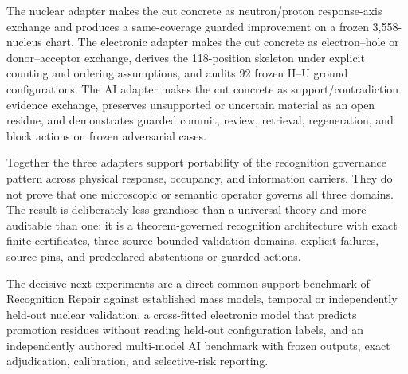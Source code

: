 The nuclear adapter makes the cut concrete as neutron/proton response-axis exchange and produces a same-coverage guarded improvement on a frozen 3,558-nucleus chart. The electronic adapter makes the cut concrete as electron--hole or donor--acceptor exchange, derives the 118-position skeleton under explicit counting and ordering assumptions, and audits 92 frozen H--U ground configurations. The AI adapter makes the cut concrete as support/contradiction evidence exchange, preserves unsupported or uncertain material as an open residue, and demonstrates guarded commit, review, retrieval, regeneration, and block actions on frozen adversarial cases.

Together the three adapters support portability of the recognition governance pattern across physical response, occupancy, and information carriers. They do not prove that one microscopic or semantic operator governs all three domains. The result is deliberately less grandiose than a universal theory and more auditable than one: it is a theorem-governed recognition architecture with exact finite certificates, three source-bounded validation domains, explicit failures, source pins, and predeclared abstentions or guarded actions.

The decisive next experiments are a direct common-support benchmark of Recognition Repair against established mass models, temporal or independently held-out nuclear validation, a cross-fitted electronic model that predicts promotion residues without reading held-out configuration labels, and an independently authored multi-model AI benchmark with frozen outputs, exact adjudication, calibration, and selective-risk reporting.
